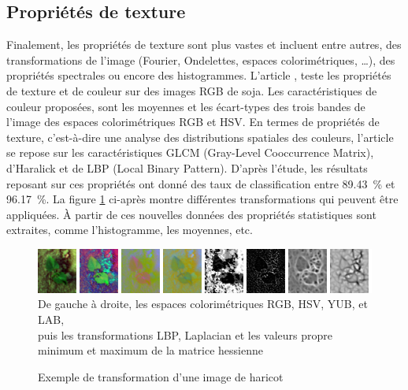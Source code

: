 \documentclass[../thesis.tex]{subfiles}
\begin{document}
    
    \subsection{Propriétés de texture}  Finalement, les propriétés de texture sont plus vastes et incluent entre autres, des transformations de l'image (Fourier, Ondelettes, espaces colorimétriques, \dots), des propriétés spectrales ou encore des histogrammes. L'article \cite{mekhalfa2021supervised}, teste les propriétés de texture et de couleur sur des images RGB de soja. Les caractéristiques de couleur proposées, sont les moyennes et les écart-types des trois bandes de l'image des espaces colorimétriques RGB et HSV. En termes de propriétés de texture, c'est-à-dire une analyse des distributions spatiales des couleurs, l'article se repose sur les caractéristiques GLCM (Gray-Level Cooccurrence Matrix), d'Haralick et de LBP (Local Binary Pattern). D'après l'étude, les résultats reposant sur ces propriétés ont donné des taux de classification entre \SI{89.43}{\percent} et \SI{96.17}{\percent}. La figure \ref{fig:03-feature-color} ci-après montre différentes transformations qui peuvent être appliquées. À partir de ces nouvelles données des propriétés statistiques sont extraites, comme l'histogramme, les moyennes, etc.
    
    \begin{figure}[H]
        \centering
        \includegraphics[width=\linewidth]{img/biblio/feature-colorspace}
        {\scriptsize De gauche à droite, les espaces colorimétriques RGB, HSV, YUB, et LAB, \\ puis les transformations LBP, Laplacian et les valeurs propre minimum et maximum de la matrice hessienne}
        \caption{Exemple de transformation d'une image de haricot}
        \label{fig:03-feature-color}
    \end{figure}
    
    
    
\end{document}
